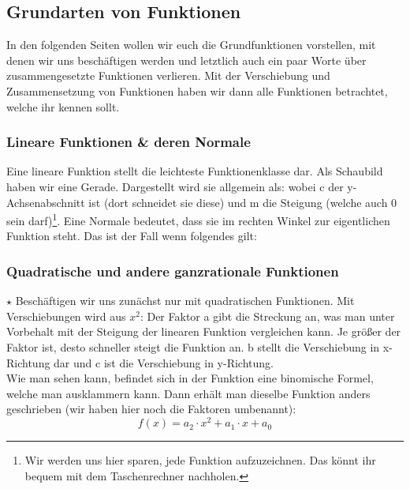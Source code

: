 \subsection{Grundarten von Funktionen}
	In den folgenden Seiten wollen wir euch die Grundfunktionen vorstellen, mit
	denen wir uns beschäftigen werden und letztlich auch ein paar Worte über
	zusammengesetzte Funktionen verlieren. Mit der Verschiebung und Zusammensetzung
	von Funktionen haben wir dann alle Funktionen betrachtet, welche ihr kennen
	sollt.

	\subsubsection{Lineare Funktionen \& deren Normale}
		Eine lineare Funktion stellt die leichteste Funktionenklasse dar. Als
		Schaubild haben wir eine Gerade. Dargestellt wird sie allgemein als:
		\formel{\[f(x)=m\cdot x+c\]}
		wobei c der y-Achsenabschnitt ist (dort schneidet sie diese) und m die
		Steigung (welche auch 0 sein darf)\footnote{Wir werden uns hier sparen, jede
		Funktion aufzuzeichnen. Das könnt ihr bequem mit dem Taschenrechner
		nachholen.}. Eine Normale bedeutet, dass sie im rechten Winkel zur
		eigentlichen Funktion steht. Das ist der Fall wenn folgendes gilt:
		\formel{\[m_2=-\frac{1}{m_1}\]}

	\subsubsection{Quadratische und andere ganzrationale Funktionen}
		\(\star\) Beschäftigen wir uns zunächst nur mit quadratischen Funktionen. Mit
		Verschiebungen wird aus \(x^2\):
		\formel{\[f(x)=a(x-b)^2+c\]}
		Der Faktor a gibt die Streckung an, was man unter Vorbehalt mit der Steigung
		der linearen Funktion vergleichen kann. Je größer der Faktor ist, desto
		schneller steigt die Funktion an. b  stellt die Verschiebung in x-Richtung dar
		und c ist die Verschiebung in y-Richtung.\\
		Wie man sehen kann, befindet sich in der Funktion eine binomische Formel,
		welche man ausklammern kann. Dann erhält man dieselbe Funktion anders
		geschrieben (wir haben hier noch die Faktoren umbenannt):
		\[f(x)=a_2 \cdot x^2+a_1 \cdot x+a_0\]

